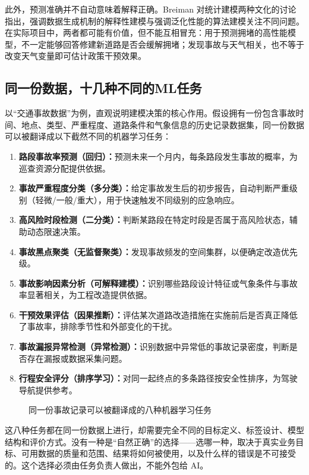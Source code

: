 此外，预测准确并不自动意味着解释正确。Breiman 对统计建模两种文化的讨论指出，强调数据生成机制的解释性建模与强调泛化性能的算法建模关注不同问题\cite{breiman2001statistical}。在实际项目中，两者都可能有价值，但不能互相冒充：用于预测拥堵的高性能模型，不一定能够回答修建新道路是否会缓解拥堵；发现事故与天气相关，也不等于改变天气变量即可估计政策干预效果。

\subsection{同一份数据，十几种不同的ML任务}

以“交通事故数据”为例，直观说明建模决策的核心作用。假设拥有一份包含事故时间、地点、类型、严重程度、道路条件和气象信息的历史记录数据集，同一份数据可以被翻译成以下截然不同的机器学习任务：

\begin{enumerate}
  \item \textbf{路段事故率预测（回归）：}预测未来一个月内，每条路段发生事故的概率，为巡查资源分配提供依据。
  \item \textbf{事故严重程度分类（多分类）：}给定事故发生后的初步报告，自动判断严重级别（轻微/一般/重大），用于快速触发不同级别的应急响应。
  \item \textbf{高风险时段检测（二分类）：}判断某路段在特定时段是否属于高风险状态，辅助动态限速决策。
  \item \textbf{事故黑点聚类（无监督聚类）：}发现事故频发的空间集群，以便确定改造优先级。
  \item \textbf{事故影响因素分析（可解释建模）：}识别哪些路段设计特征或气象条件与事故率显著相关，为工程改造提供依据。
  \item \textbf{干预效果评估（因果推断）：}评估某次道路改造措施在实施前后是否真正降低了事故率，排除季节性和外部变化的干扰。
  \item \textbf{事故漏报异常检测（异常检测）：}识别数据中异常低的事故记录密度，判断是否存在漏报或数据采集问题。
  \item \textbf{行程安全评分（排序学习）：}对同一起终点的多条路径按安全性排序，为驾驶导航提供参考。
\end{enumerate}


\begin{figure}[H]
  \centering
  \caption{同一份事故记录可以被翻译成的八种机器学习任务}
  \label{fig:ch03_tasks}
\end{figure}

这八种任务都在同一份数据上进行，却需要完全不同的目标定义、标签设计、模型结构和评价方式。没有一种是“自然正确”的选择——选哪一种，取决于真实业务目标、可用数据的质量和范围、结果将如何被使用，以及什么样的错误是不可接受的。这个选择必须由任务负责人做出，不能外包给 AI。

